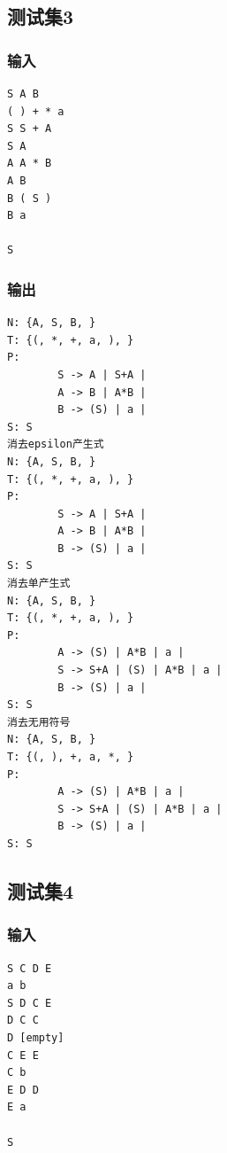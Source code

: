 \documentclass[lang=cn,11pt,a4paper,cite=authornum]{paper}
\begin{document}
\subsection{测试集3}

\subsubsection{输入}

\begin{code}
\begin{verbatim}
S A B
( ) + * a
S S + A
S A
A A * B
A B
B ( S )
B a

S
\end{verbatim}
\end{code}

\subsubsection{输出}

\begin{code}
\begin{verbatim}
N: {A, S, B, }
T: {(, *, +, a, ), }
P:
        S -> A | S+A | 
        A -> B | A*B | 
        B -> (S) | a | 
S: S
消去epsilon产生式
N: {A, S, B, }
T: {(, *, +, a, ), }
P:
        S -> A | S+A | 
        A -> B | A*B | 
        B -> (S) | a | 
S: S
消去单产生式
N: {A, S, B, }
T: {(, *, +, a, ), }
P:
        A -> (S) | A*B | a | 
        S -> S+A | (S) | A*B | a | 
        B -> (S) | a | 
S: S
消去无用符号
N: {A, S, B, }
T: {(, ), +, a, *, }
P:
        A -> (S) | A*B | a | 
        S -> S+A | (S) | A*B | a | 
        B -> (S) | a | 
S: S
\end{verbatim}
\end{code}

\subsection{测试集4}

\subsubsection{输入}

\begin{code}
\begin{verbatim}
S C D E
a b
S D C E
D C C
D [empty]
C E E
C b
E D D
E a

S
\end{verbatim}
\end{code}
\end{document}
